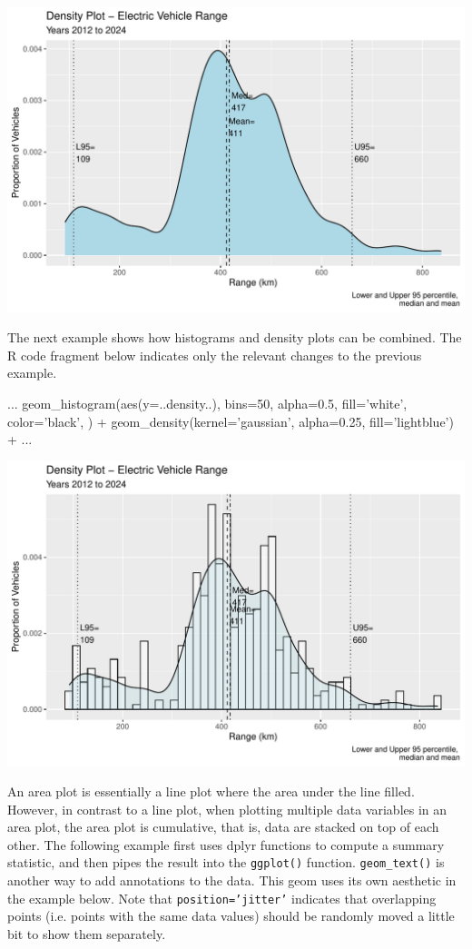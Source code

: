 \begin{center}
  \includegraphics[width=.8\textwidth]{fuel.density.pdf}
\end{center}

The next example shows how histograms and density plots can be combined. The R code fragment below indicates only the relevant changes to the previous example.

\begin{samepage}
\begin{Rcode}
...
geom_histogram(aes(y=..density..), bins=50, 
     alpha=0.5, fill='white', color='black', ) +
geom_density(kernel='gaussian', 
     alpha=0.25, fill='lightblue') + 
...
\end{Rcode}
\end{samepage}

\begin{center}
  \includegraphics[width=.8\textwidth]{fuel.histogram.pdf}
\end{center}

An area plot is essentially a line plot where the area under the line filled. However, in contrast to a line plot, when plotting multiple data variables in an area plot, the area plot is cumulative, that is, data are stacked on top of each other. The following example first uses dplyr functions to compute a summary statistic, and then pipes the result into the \texttt{ggplot()} function. \texttt{geom\_text()} is another way to add annotations to the data. This geom uses its own aesthetic in the example below. Note that \texttt{position='jitter'} indicates that overlapping points (i.e. points with the same data values) should be randomly moved a little bit to show them separately. 

